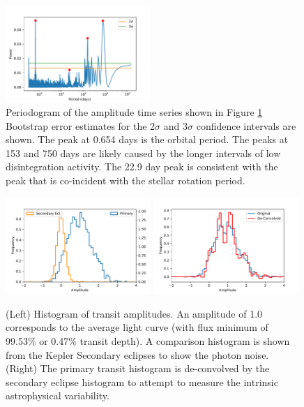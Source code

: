\documentclass[preprint]{aastex61}
\begin{document}
\begin{figure}[!hbtp]
\begin{centering}
\includegraphics[width=0.49\textwidth]{images/kepler/amplitude_periodogram.pdf}
\caption{Periodogram of the amplitude time series shown in Figure \ref{fig:PCAamp}
Bootstrap error estimates for the 2$\sigma$ and 3$\sigma$ confidence intervals are shown.
The peak at 0.654 days is the orbital period.
The peaks at 153 and 750 days are likely caused by the longer intervals of low disintegration activity.
The 22.9 day peak is consistent with the \citet{kawahara2013starspots} peak that is co-incident with the stellar rotation period.}\label{fig:PCAamp}
\end{centering}
\end{figure}

\begin{figure}[!hbtp]
\begin{centering}
\includegraphics[width=0.49\textwidth]{images/kepler/amplitude_histogram.pdf}
\includegraphics[width=0.49\textwidth]{images/kepler/deconvolved_hist.pdf}
\caption{(Left) Histogram of transit amplitudes.
An amplitude of 1.0 corresponds to the average light curve (with flux minimum of 99.53\% or 0.47\% transit depth).
A comparison histogram is shown from the Kepler Secondary eclipses to show the photon noise.
(Right) The primary transit histogram is de-convolved by the secondary eclipse histogram to attempt to measure the intrinsic astrophysical variability.}\label{fig:histograms}
\end{centering}
\end{figure}
\end{document}
